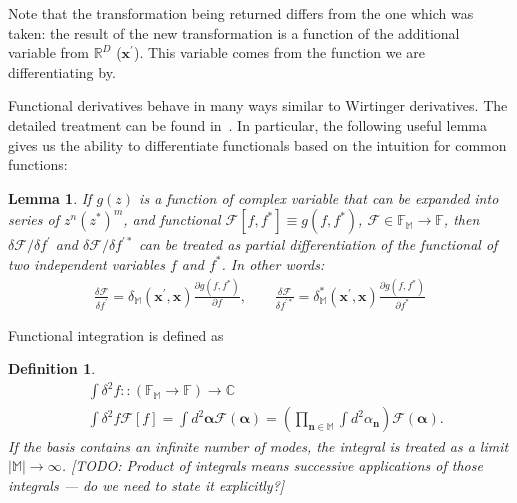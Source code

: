 \documentclass[12pt,aip,jmp,amssymb,amsmath]{revtex4-1}
\newtheorem{definition}{Definition}
\newtheorem{lemma}{Lemma}
\begin{document}
Note that the transformation being returned differs from the one which was taken: the result of the new transformation is a function of the additional variable from $\mathbb{R}^D$ ($\boldsymbol{x}^\prime$).
This variable comes from the function we are differentiating by.

Functional derivatives behave in many ways similar to Wirtinger derivatives.
The detailed treatment can be found in~\cite{Dalton2011}.
In particular, the following useful lemma gives us the ability to differentiate functionals based on the intuition for common functions:

\begin{lemma}
    If $g(z)$ is a function of complex variable that can be expanded into series of $z^n (z^*)^m$, and functional $\mathcal{F}[f, f^*] \equiv g(f, f^*)$, $\mathcal{F} \in \mathbb{F}_{\mathbb{M}} \rightarrow \mathbb{F}$, then $\delta \mathcal{F} / \delta f^\prime$ and $\delta \mathcal{F} / \delta f^{\prime*}$ can be treated as partial differentiation of the functional of two independent variables $f$ and $f^*$.
    In other words:
    \begin{eqnarray*}
        \frac{\delta \mathcal{F}}{\delta f^\prime}
        = \delta_{\mathbb{M}}(\boldsymbol{x}^\prime, \boldsymbol{x})
            \frac{\partial g(f, f^*)}{\partial f},
        \qquad
        \frac{\delta \mathcal{F}}{\delta f^{\prime*}}
        = \delta_{\mathbb{M}}^*(\boldsymbol{x}^\prime, \boldsymbol{x})
            \frac{\partial g(f, f^*)}{\partial f^*}
    \end{eqnarray*}
\end{lemma}

Functional integration is defined as

\begin{definition}
    \begin{eqnarray*}
        & \int \delta^2 f :: (\mathbb{F}_{\mathbb{M}} \rightarrow \mathbb{F}) \rightarrow \mathbb{C} \\
        & \int \delta^2 f \mathcal{F}[f]
        = \int d^2\boldsymbol{\alpha} \mathcal{F}(\boldsymbol{\alpha})
        = \left(
            \prod_{\boldsymbol{n} \in \mathbb{M}} \int d^2\alpha_{\boldsymbol{n}}
        \right) \mathcal{F}(\boldsymbol{\alpha}).
    \end{eqnarray*}
    If the basis contains an infinite number of modes, the integral is treated as a limit $|\mathbb{M}| \rightarrow \infty$.
    [TODO: Product of integrals means successive applications of those integrals --- do we need to state it explicitly?]
\end{definition}
\end{document}
